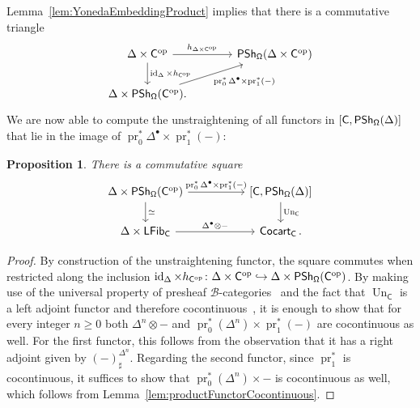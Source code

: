 \documentclass[reqno]{amsart}
\numberwithin{equation}{subsection}
\theoremstyle{plain}
\newtheorem{proposition}[equation]{Proposition}
\theoremstyle{definition}
\let\scr=\mathcal
\let\into=\hookrightarrow
\def\BB{\scr B}
\DeclareMathOperator{\id}{id}
\DeclareMathOperator{\IPSh}{\mathsf{PSh}}
\DeclareMathOperator{\ICocart}{\mathsf{Cocart}}
\DeclareMathOperator{\ILFib}{\mathsf{LFib}}
\DeclareMathOperator{\pr}{pr}
\DeclareMathOperator{\Un}{Un}
\newcommand{\op}{\mathrm{op}}
\newcommand{\I}[1]{\mathsf{#1}}
\newcommand{\iFun}[2]{{[#1,#2]}}
\begin{document}
Lemma~\ref{lem:YonedaEmbeddingProduct} implies that there is a commutative triangle
\begin{equation*}
\begin{tikzcd}[column sep=large]
	\Delta\times\I{C}^{\op}\arrow[r, "{h_{\Delta\times\I{C}^{\op}}}"]\arrow[d, "\id_{\Delta}\times h_{\I{C}^{\op}}"] & \IPSh_{\Univ}(\Delta\times\I{C}^{\op})\\
	\Delta\times\IPSh_{\Univ}(\I{C}^{\op}).\arrow[ur, "\pr_0^\ast\Delta^\bullet\times\pr_1^\ast(-)"'] &
\end{tikzcd}
\end{equation*}
We are now able to compute the unstraightening of all functors in $\iFun{\I{C}}{\IPSh_{\Univ}(\Delta)}$ that lie in the image of $\pr_0^\ast \Delta^{\bullet}\times\pr_1^\ast(-)$:
\begin{proposition}
	\label{prop:UnstraighteningExplicitly}
	There is a commutative square
	\begin{equation*}
	\begin{tikzcd}[column sep={between origins,12em}]
	\Delta\times\IPSh_{\Univ}(\I{C}^{\op})\arrow[d, "\simeq"]\arrow[r, "\pr_0^\ast \Delta^\bullet\times\pr_1^\ast(-)"] &\iFun{\I{C}}{\IPSh_{\Univ}(\Delta)}\arrow[d, "\Un_{\I{C}}"]\\
	\Delta\times\ILFib_{\I{C}}\arrow[r, "\Delta^\bullet\otimes -"] & \ICocart_{\I{C}}.
	\end{tikzcd}
	\end{equation*}
\end{proposition}
\begin{proof}
	By construction of the unstraightening functor, the square commutes when restricted along the inclusion $\id_{\Delta}\times h_{\I{C}^{\op}}\colon \Delta\times\I{C}^{\op}\into\Delta\times\IPSh_{\Univ}(\I{C}^{\op})$. By making use of the universal property of presheaf $\BB$-categories~\cite[Theorem~7.1.1]{Martini2021a} and the fact that $\Un_{\I{C}}$ is a left adjoint functor and therefore cocontinuous~\cite[Proposition~5.1.5]{Martini2021a}, it is enough to show that for every integer $n\geq 0$ both $\Delta^n\otimes -$ and $\pr_0^\ast(\Delta^n)\times\pr_1^\ast(-)$ are cocontinuous as well. For the first functor, this follows from the observation that it has a right adjoint given by $(-)^{\Delta^n}_\sharp$. Regarding the second functor, since $\pr_1^\ast$ is cocontinuous, it suffices to show that $\pr_0^\ast(\Delta^n)\times-$ is cocontinuous as well, which follows from Lemma~\ref{lem:productFunctorCocontinuous}.
\end{proof}
\end{document}
